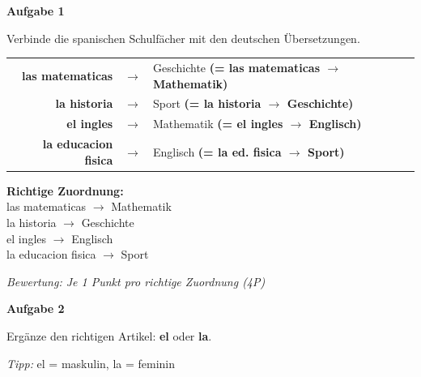 \documentclass[11pt, a4paper]{article}
\newcommand{\fachfarbe}{spanisch}
\newcommand{\punktebox}[1]{\hfill\fbox{\small \_/#1}}
\newcommand{\loesung}[1]{\textcolor{loesung}{\textbf{#1}}}
\newenvironment{aufgabe}[1]{%
    \needspace{5\baselineskip}%
    \nopagebreak[4]%
    \vspace{10pt}
    \noindent\textbf{\textcolor{\fachfarbe}{Aufgabe #1}}
    \nopagebreak[4]%
    \vspace{5pt}
    \nopagebreak[4]%
    \begin{list}{}{\leftmargin=0pt}
    \item[]
}{%
    \end{list}
}
\newcommand{\es}[1]{\textcolor{\fachfarbe}{\textbf{#1}}}
\begin{document}
\vspace{10pt}


\begin{aufgabe}{1}
Verbinde die spanischen Schulfächer mit den deutschen Übersetzungen. \punktebox{4}
\end{aufgabe}

\begin{center}
\begin{tabular}{rcl}
\es{las matematicas} & \loesung{$\longrightarrow$} & Geschichte \loesung{(= las matematicas $\rightarrow$ Mathematik)} \\[0.8em]
\es{la historia} & \loesung{$\longrightarrow$} & Sport \loesung{(= la historia $\rightarrow$ Geschichte)} \\[0.8em]
\es{el ingles} & \loesung{$\longrightarrow$} & Mathematik \loesung{(= el ingles $\rightarrow$ Englisch)} \\[0.8em]
\es{la educacion fisica} & \loesung{$\longrightarrow$} & Englisch \loesung{(= la ed. fisica $\rightarrow$ Sport)} \\
\end{tabular}
\end{center}

\textcolor{loesung}{\textbf{Richtige Zuordnung:}\\
las matematicas $\rightarrow$ Mathematik\\
la historia $\rightarrow$ Geschichte\\
el ingles $\rightarrow$ Englisch\\
la educacion fisica $\rightarrow$ Sport}

\textit{\textcolor{grau}{Bewertung: Je 1 Punkt pro richtige Zuordnung (4P)}}

\vspace{15pt}


\begin{aufgabe}{2}
Ergänze den richtigen Artikel: \textbf{el} oder \textbf{la}. \punktebox{4}
\end{aufgabe}

\begin{vokabelkasten}
\textit{Tipp:} el = maskulin, la = feminin
\end{vokabelkasten}
\end{document}
